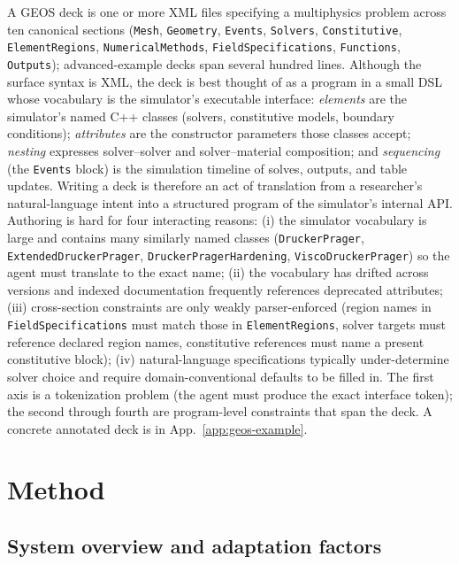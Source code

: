 \documentclass{article}
\begin{document}
A GEOS deck is one or more XML files specifying a multiphysics problem across ten canonical sections (\texttt{Mesh}, \texttt{Geometry}, \texttt{Events}, \texttt{Solvers}, \texttt{Constitutive}, \texttt{ElementRegions}, \texttt{NumericalMethods}, \texttt{FieldSpecifications}, \texttt{Functions}, \texttt{Outputs}); advanced-example decks span several hundred lines. Although the surface syntax is XML, the deck is best thought of as a program in a small DSL whose vocabulary is the simulator's executable interface: \emph{elements} are the simulator's named C++ classes (solvers, constitutive models, boundary conditions); \emph{attributes} are the constructor parameters those classes accept; \emph{nesting} expresses solver--solver and solver--material composition; and \emph{sequencing} (the \texttt{Events} block) is the simulation timeline of solves, outputs, and table updates. Writing a deck is therefore an act of translation from a researcher's natural-language intent into a structured program of the simulator's internal API. Authoring is hard for four interacting reasons: (i) the simulator vocabulary is large and contains many similarly named classes (\texttt{DruckerPrager}, \texttt{ExtendedDruckerPrager}, \texttt{DruckerPragerHardening}, \texttt{ViscoDruckerPrager}) so the agent must translate to the exact name; (ii) the vocabulary has drifted across versions and indexed documentation frequently references deprecated attributes; (iii) cross-section constraints are only weakly parser-enforced (region names in \texttt{FieldSpecifications} must match those in \texttt{ElementRegions}, solver targets must reference declared region names, constitutive references must name a present constitutive block); (iv) natural-language specifications typically under-determine solver choice and require domain-conventional defaults to be filled in. The first axis is a tokenization problem (the agent must produce the exact interface token); the second through fourth are program-level constraints that span the deck. A concrete annotated deck is in App.~\ref{app:geos-example}.


\section{Method}
\label{sec:method}

\subsection{System overview and adaptation factors}
\label{subsec:overview}
\end{document}
